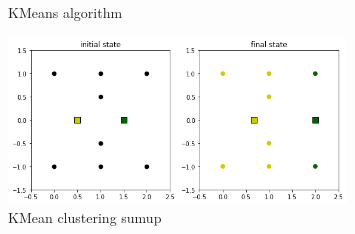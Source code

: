 \documentclass{homework}
\begin{document}
\begin{itemize}
\begin{figure}[hbt!]
		\caption{KMeans algorithm}
	\end{figure}
	\hfill
	\begin{figure}[hbt!]
		\centering
		\includegraphics[width=0.8\textwidth]{kmeans_exercise_3_sumup.png}
		\caption{KMean clustering sumup}
	\end{figure}
\end{itemize}
\end{document}
